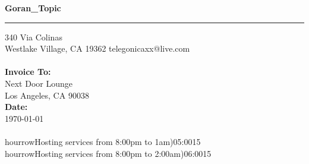 \documentclass{invoice}
\def \tab {\hspace*{3ex}}
\begin{document}
\hfil{\Huge\bf Goran_Topic}\hfil
\bigskip\break
\hrule
340 Via Colinas \hfill  \\ 
Westlake Village, CA 19362 \hfill telegonicaxx@live.com
\\ \\
{\bf Invoice To:} \\
\tab Next Door Lounge \\ 
\tab Los Angeles, CA 90038 \\ 
{\bf Date:} \\
\tab \today \\
\\hourrow{Hosting services from 8:00pm to 1am)}{05:00}{15}
\\hourrow{Hosting services from 8:00pm to 2:00am)}{06:00}{15}
\end{document}
